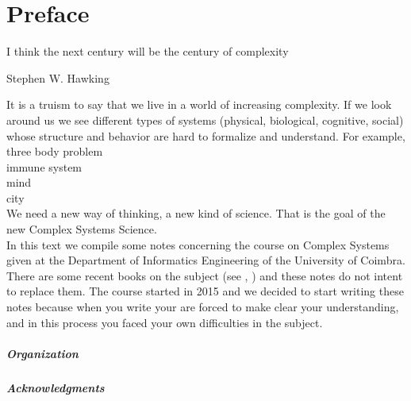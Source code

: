
\chapter*{Preface}

\epigraph{I think the next century will be the century of complexity}{Stephen W. Hawking}

It is a truism to say that we live in a world of increasing complexity. If we look around us we see different types of systems (physical, biological, cognitive, social) whose structure and behavior are hard to formalize and understand. For example,\\

 three body problem\\
 immune system\\
 mind\\
 city\\
 
We need a new way of thinking, a new kind of science. That is the goal of the new Complex Systems Science.\\


In this text we compile some notes concerning the course on Complex Systems given at the Department of Informatics Engineering of the University of Coimbra. There are some recent books on the subject (see \cite{Sayama2015}, \cite{Barabasi2015}) and these notes do not intent to replace them. The course started in 2015 and we decided to start writing these notes because when you write your are forced to make clear your understanding, and in this process you faced your own difficulties in the subject.
  
  
 \paragraph{Organization} 
  
 \paragraph{Acknowledgments}
  
  
  